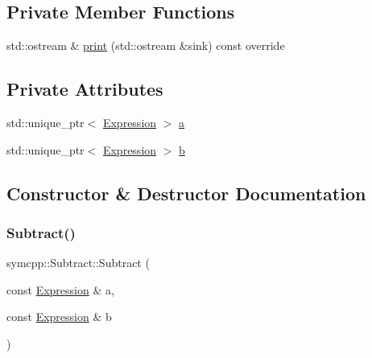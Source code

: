 \subsection*{Private Member Functions}
\begin{DoxyCompactItemize}
\item 
std\+::ostream \& \mbox{\hyperlink{classsymcpp_1_1Subtract_a7f0af9519d3a4978abf85e88da7d682d}{print}} (std\+::ostream \&sink) const override
\end{DoxyCompactItemize}
\subsection*{Private Attributes}
\begin{DoxyCompactItemize}
\item 
std\+::unique\+\_\+ptr$<$ \mbox{\hyperlink{classsymcpp_1_1Expression}{Expression}} $>$ \mbox{\hyperlink{classsymcpp_1_1Subtract_a3ef44b38ab098faab493079d994d35ba}{a}}
\item 
std\+::unique\+\_\+ptr$<$ \mbox{\hyperlink{classsymcpp_1_1Expression}{Expression}} $>$ \mbox{\hyperlink{classsymcpp_1_1Subtract_ac5c9bd87c3554a20d9bf12f5a53a9613}{b}}
\end{DoxyCompactItemize}


\subsection{Constructor \& Destructor Documentation}
\mbox{\label{classsymcpp_1_1Subtract_ab77cda12501d9e57a2346eea44e578e2}} 
\subsubsection{\texorpdfstring{Subtract()}{Subtract()}\hspace{0.1cm}{\footnotesize\ttfamily [1/2]}}
{\footnotesize\ttfamily symcpp\+::\+Subtract\+::\+Subtract (\begin{DoxyParamCaption}\item[{const \mbox{\hyperlink{classsymcpp_1_1Expression}{Expression}} \&}]{a,  }\item[{const \mbox{\hyperlink{classsymcpp_1_1Expression}{Expression}} \&}]{b }\end{DoxyParamCaption})}

\mbox{\label{classsymcpp_1_1Subtract_a30ad18aceec0bdc15756d2618a8ed6e4}} 
